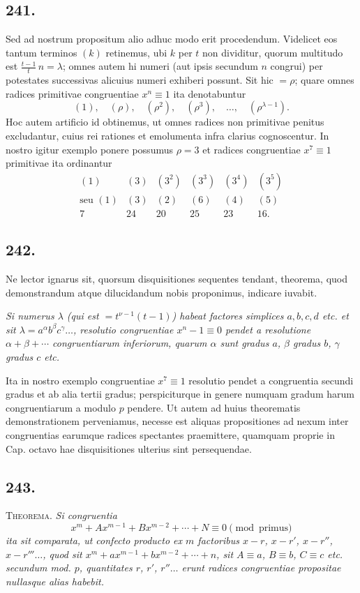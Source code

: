 \documentclass[12pt]{article}
\begin{document}
\subsection*{241.}
Sed ad nostrum propositum alio adhuc modo erit procedendum. Videlicet eos tantum terminos $(k)$ retinemus, ubi $k$ per $t$ non dividitur, quorum multitudo est $\frac{t-1}{t}\,n=\lambda$; omnes autem hi numeri (aut ipsis secundum $n$ congrui) per potestates successivas alicuius numeri exhiberi possunt. Sit hic $=\rho$; quare omnes radices primitivae congruentiae $x^n\equiv 1$ ita denotabuntur
\[
(1),\quad (\rho),\quad (\rho^2),\quad (\rho^3),\quad \ldots,\quad (\rho^{\lambda-1}).
\]
Hoc autem artificio id obtinemus, ut omnes radices non primitivae penitus excludantur, cuius rei rationes et emolumenta infra clarius cognoscentur. In nostro igitur exemplo ponere possumus $\rho=3$ et radices congruentiae $x^7\equiv 1$ primitivae ita ordinantur
\[
\begin{array}{cccccc}
(1)&(3)&(3^2)&(3^3)&(3^4)&(3^5)\\
\text{seu }(1)&(3)&(2)&(6)&(4)&(5)\\
7&24&20&25&23&16.
\end{array}
\]

\subsection*{242.}
Ne lector ignarus sit, quorsum disquisitiones sequentes tendant, theorema, quod demonstrandum atque dilucidandum nobis proponimus, indicare iuvabit.

\textit{Si numerus $\lambda$ (qui est $=t^{\nu-1}(t-1)$) habeat factores simplices $a,b,c,d$ etc. et sit $\lambda=a^\alpha b^\beta c^\gamma\ldots$, resolutio congruentiae $x^n-1\equiv 0$ pendet a resolutione $\alpha+\beta+\cdots$ congruentiarum inferiorum, quarum $\alpha$ sunt gradus $a$, $\beta$ gradus $b$, $\gamma$ gradus $c$ etc.}

Ita in nostro exemplo congruentiae $x^7\equiv 1$ resolutio pendet a congruentia secundi gradus et ab alia tertii gradus; perspiciturque in genere numquam gradum harum congruentiarum a modulo $p$ pendere. Ut autem ad huius theorematis demonstrationem perveniamus, necesse est aliquas propositiones ad nexum inter congruentias earumque radices spectantes praemittere, quamquam proprie in Cap. octavo hae disquisitiones ulterius sint persequendae.

\subsection*{243.}
\textsc{Theorema.} \textit{Si congruentia}
\[
x^m+A x^{m-1}+B x^{m-2}+\cdots+N\equiv 0\pmod{\text{primus}}
\]
\textit{ita sit comparata, ut confecto producto ex $m$ factoribus $x-r$, $x-r'$, $x-r''$, $x-r'''\ldots$, quod sit $x^m+a x^{m-1}+b x^{m-2}+\cdots+n$, sit $A\equiv a$, $B\equiv b$, $C\equiv c$ etc. secundum mod. $p$, quantitates $r$, $r'$, $r''\ldots$ erunt radices congruentiae propositae nullasque alias habebit.}
\end{document}
